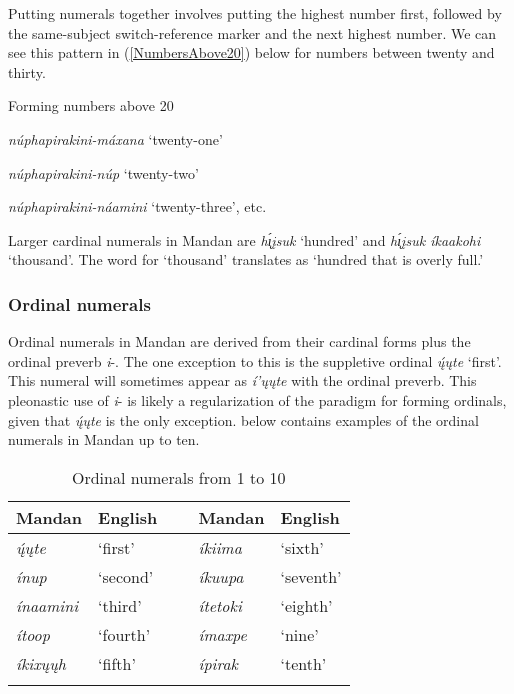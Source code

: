 Putting numerals together involves putting the highest number first, followed by the same-subject switch-reference marker and the next highest number. We can see this pattern in (\ref{NumbersAbove20}) below for numbers between twenty and thirty.

\newpage
\begin{exe}

\item\label{NumbersAbove20} Forming numbers above 20

    \begin{xlist}
    \item \textit{núphapirakini-máxana} `twenty-one'
    \item \textit{núphapirakini-núp} `twenty-two'
    \item \textit{núphapirakini-náamini} `twenty-three', etc.
    \end{xlist}


\end{exe}

Larger cardinal numerals in Mandan are \textit{h\'{ı̨}įsuk} `hundred' and \textit{h\'{ı̨}įsuk íkaakohi} `thousand'. The word for `thousand' translates as `hundred that is overly full.'

\subsubsection{Ordinal numerals}\label{SubSubSecOrdinal}

Ordinal numerals in Mandan are derived from their cardinal forms plus the ordinal preverb \textit{i}-. The one exception to this is the suppletive ordinal \textit{ų́ųte} `first'. This numeral will sometimes appear as \textit{í'ųųte} with the ordinal preverb. This pleonastic use of \textit{i}- is likely a regularization of the paradigm for forming ordinals, given that \textit{ų́ųte} is the only exception.  below contains examples of the ordinal numerals in Mandan up to ten.

\begin{table}
        \caption{Ordinal numerals from 1 to 10}\label{Tab1to10ordinal}
    \begin{tabular}{lllll}
\lsptoprule
    \textbf{Mandan}&\textbf{English}& ~&  \textbf{Mandan}&\textbf{English}\\
\midrule
    \textit{ų́ųte}&`first'&~& 
        \textit{íkiima}&`sixth'\\
    \textit{ínup}&`second'&~&     
        \textit{íkuupa}&`seventh'\\
    \textit{ínaamini}&`third'&~&  
        \textit{ítetoki}&`eighth'\\
    \textit{ítoop}&`fourth'&~&   
        \textit{ímaxpe}&`nine'\\
    \textit{íkixųųh}&`fifth'&~&\textit{ípirak}&`tenth'\\\lspbottomrule
    \end{tabular}

\end{table}

